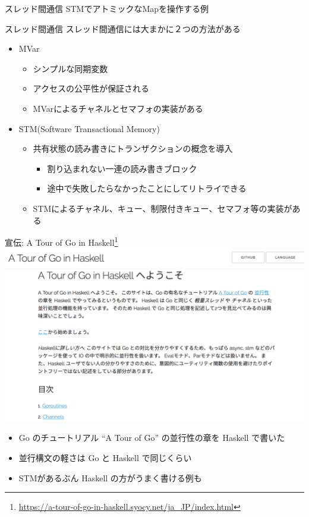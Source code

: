 \documentclass[unicode,12pt]{beamer}
\begin{document}
\begin{frame}{スレッド間通信}
  STMでアトミックなMapを操作する例
  
\end{frame}

\begin{frame}{スレッド間通信}
  スレッド間通信には大まかに２つの方法がある
  \begin{itemize}
  \item MVar
    \begin{itemize}
    \item シンプルな同期変数
    \item アクセスの\alert{公平性}が保証される
    \item MVarによるチャネルとセマフォの実装がある
    \end{itemize}
  \item STM(Software Transactional Memory)
    \begin{itemize}
    \item 共有状態の読み書きに\alert{トランザクション}の概念を導入
      \begin{itemize}
      \item 割り込まれない一連の読み書きブロック
      \item 途中で失敗したらなかったことにしてリトライできる
      \end{itemize}
    \item STMによるチャネル、キュー、制限付きキュー、セマフォ等の実装がある
    \end{itemize}
  \end{itemize}
\end{frame}

\begin{frame}{宣伝: A Tour of Go in Haskell\footnote{\url{https://a-tour-of-go-in-haskell.syocy.net/ja_JP/index.html}}}
  \centering
  \includegraphics[width=.55\textwidth]{pic/a_tour_of_go_in_haskell.png}
  \begin{itemize}
  \item Go のチュートリアル ``A Tour of Go'' の並行性の章を Haskell で書いた
  \item 並行構文の軽さは Go と Haskell で同じくらい
  \item STMがあるぶん Haskell の方がうまく書ける例も
  \end{itemize}
\end{frame}
\end{document}
